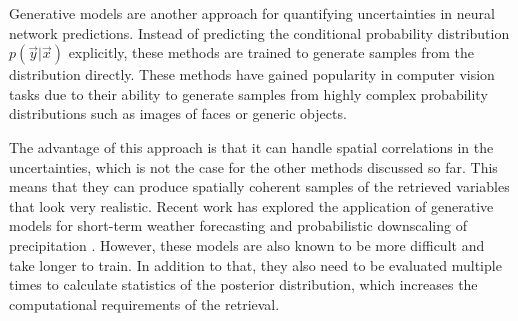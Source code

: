 Generative models are another approach for quantifying uncertainties in neural
network predictions. Instead of predicting the conditional probability
distribution $p(\vec{y}|\vec{x})$ explicitly, these methods are trained to generate
samples from the distribution directly. These methods have gained popularity in
computer vision tasks due to their ability to generate samples from highly
complex probability distributions such as images of faces or generic objects.

The advantage of this approach is that it can handle spatial correlations in the
uncertainties, which is not the case for the other methods discussed so far.
This means that they can produce spatially coherent samples of the retrieved
variables that look very realistic. Recent work has explored the application of
generative models for short-term weather forecasting \citep{ravuri21} and
probabilistic downscaling of precipitation \citep{harris22, leinonen20}.
However, these models are also known to be more difficult and take longer to
train. In addition to that, they also need to be evaluated multiple times to
calculate statistics of the posterior distribution, which increases the
computational requirements of the retrieval.
